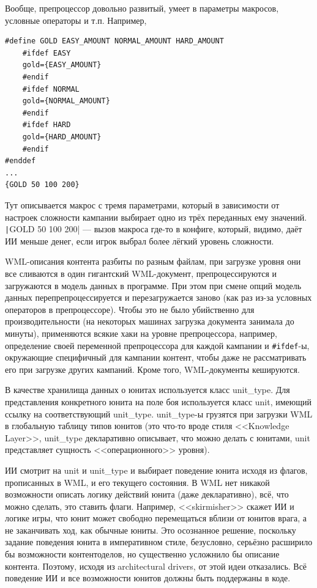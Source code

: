 \documentclass{../../text-style}
\begin{document}
Вообще, препроцессор довольно развитый, умеет в параметры макросов, условные операторы и т.п. Например,

\begin{verbatim}
#define GOLD EASY_AMOUNT NORMAL_AMOUNT HARD_AMOUNT
    #ifdef EASY
    gold={EASY_AMOUNT}
    #endif
    #ifdef NORMAL
    gold={NORMAL_AMOUNT}
    #endif
    #ifdef HARD
    gold={HARD_AMOUNT}
    #endif
#enddef
...
{GOLD 50 100 200}
\end{verbatim}

Тут описывается макрос с тремя параметрами, который в зависимости от настроек сложности кампании выбирает одно из трёх переданных ему значений. \texttt|{GOLD 50 100 200}| --- вызов макроса где-то в конфиге, который, видимо, даёт ИИ меньше денег, если игрок выбрал более лёгкий уровень сложности.

WML-описания контента разбиты по разным файлам, при загрузке уровня они все сливаются в один гигантский WML-документ, препроцессируются и загружаются в модель данных в программе. При этом при смене опций модель данных перепрепроцессируется и перезагружается заново (как раз из-за условных операторов в препроцессоре). Чтобы это не было убийственно для производительности (на некоторых машинах загрузка документа занимала до минуты), применяются всякие хаки на уровне препроцессора, например, определение своей переменной препроцессора для каждой кампании и \texttt{#ifdef}-ы, окружающие специфичный для кампании контент, чтобы даже не рассматривать его при загрузке других кампаний. Кроме того, WML-документы кешируются.

В качестве хранилища данных о юнитах используется класс unit\_type. Для представления конкретного юнита на поле боя используется класс unit, имеющий ссылку на соответствующий unit\_type. unit\_type-ы грузятся при загрузки WML в глобальную таблицу типов юнитов (это что-то вроде стиля <<Knowledge Layer>>, unit\_type декларативно описывает, что можно делать с юнитами, unit представляет сущность <<операционного>> уровня). 

ИИ смотрит на unit и unit\_type и выбирает поведение юнита исходя из флагов, прописанных в WML, и его текущего состояния. В WML нет никакой возможности описать логику действий юнита (даже декларативно), всё, что можно сделать, это ставить флаги. Например, <<skirmisher>> скажет ИИ и логике игры, что юнит может свободно перемещаться вблизи от юнитов врага, а не заканчивать ход, как обычные юниты. Это осознанное решение, поскольку задание поведения юнита в императивном стиле, безусловно, серьёзно расширило бы возможности контентоделов, но существенно усложнило бы описание контента. Поэтому, исходя из architectural drivers, от этой идеи отказались. Всё поведение ИИ и все возможности юнитов должны быть поддержаны в коде.
\end{document}
